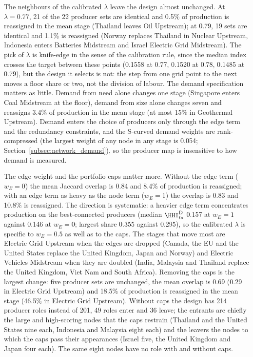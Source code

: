 The neighbours of the calibrated $\lambda$ leave the design almost unchanged. At $\lambda=0.77$,
21 of the 22 producer sets are identical and 0.5\% of production is reassigned in the mean stage
(Thailand leaves Oil Upstream); at 0.79, 19 sets are identical and 1.1\% is reassigned (Norway
replaces Thailand in Nuclear Upstream, Indonesia enters Batteries Midstream and Israel Electric
Grid Midstream). The pick of $\lambda$ is knife-edge in the sense of the calibration rule, since
the median index crosses the target between these points (0.1558 at 0.77, 0.1520 at 0.78, 0.1485
at 0.79), but the design it selects is not: the step from one grid point to the next moves a
floor share or two, not the division of labour. The demand specification matters as little.
Demand from need alone changes one stage (Singapore enters Coal Midstream at the floor), demand
from size alone changes seven and reassigns 3.4\% of production in the mean stage (at most 15\% in
Geothermal Upstream). Demand enters the choice of producers only through the edge term and the
redundancy constraints, and the S-curved demand weights are rank-compressed (the largest weight
of any node in any stage is 0.054; Section~\ref{subsec:network_demand}), so the producer map is
insensitive to how demand is measured.

The edge weight and the portfolio caps matter more. Without the edge term ($w_E=0$) the mean
Jaccard overlap is 0.84 and 8.4\% of production is reassigned; with an edge term as heavy as the
node term ($w_E=1$) the overlap is 0.83 and 10.8\% is reassigned. The direction is systematic: a
heavier edge term concentrates production on the best-connected producers (median
$\HHI^{\mathrm{D}}_{ts}$ 0.157 at $w_E=1$ against 0.146 at $w_E=0$; largest share 0.355 against
0.295), so the calibrated $\lambda$ is specific to $w_E=0.5$ as well as to the caps. The stages
that move most are Electric Grid Upstream when the edges are dropped (Canada, the EU and the
United States replace the United Kingdom, Japan and Norway) and Electric Vehicles Midstream when
they are doubled (India, Malaysia and Thailand replace the United Kingdom, Viet Nam and South
Africa). Removing the caps is the largest change: five producer sets are unchanged, the mean
overlap is 0.69 (0.29 in Electric Grid Upstream) and 18.5\% of production is reassigned in the
mean stage (46.5\% in Electric Grid Upstream). Without caps the design has 214 producer roles
instead of 201, 49 roles enter and 36 leave; the entrants are chiefly the large and high-scoring
nodes that the caps restrain (Thailand and the United States nine each, Indonesia and Malaysia
eight each) and the leavers the nodes to which the caps pass their appearances (Israel five, the
United Kingdom and Japan four each). The same eight nodes have no role with and without caps.

